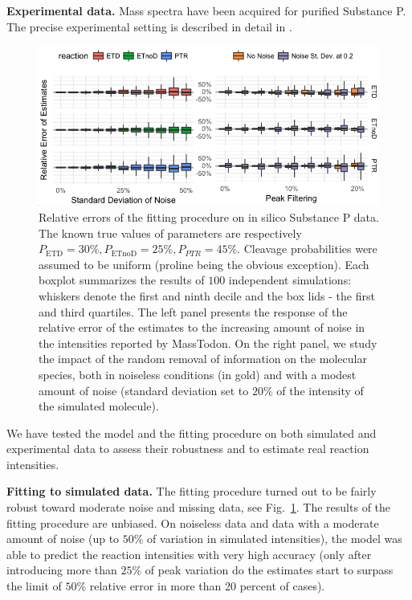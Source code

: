 \documentclass{llncs}
\begin{document}
\textbf{Experimental data.} Mass spectra have been acquired for purified Substance P. The precise experimental setting is described in detail in \cite{Lermyte2015-eb}.
\begin{figure}[h]
        \center
        \includegraphics[width=.9\textwidth]{kokos.png}
        \caption{ Relative errors of the fitting procedure on in silico Substance P data. The known true values of parameters are respectively $P_\text{ETD}=30\%, P_\text{ETnoD}= 25\%, P_{PTR}= 45\%$. Cleavage probabilities were assumed to be uniform (proline being the obvious exception). Each boxplot summarizes the results of $100$ independent simulations: whiskers denote the first and ninth decile and the box lids - the first and third quartiles. The left panel presents the response of the relative error of the estimates to the increasing amount of noise in the intensities reported by {\sc MassTodon}. On the right panel, we study the impact of the random removal of information on the molecular species, both in noiseless conditions (in gold) and with a modest amount of noise (standard deviation set to $20\%$ of the intensity of the simulated molecule).
        }\label{fig::kokos}
\end{figure}

We have tested the model and the fitting procedure on both simulated and experimental data to assess their robustness and to estimate real reaction intensities.

\textbf{Fitting to simulated data.} The fitting procedure turned out to be fairly robust toward moderate noise and missing data, see Fig.~\ref{fig::kokos}. The results of the fitting procedure are unbiased. On noiseless data and data with a moderate amount of noise (up to $50\%$ of variation in simulated intensities), the model was able to predict the reaction intensities with very high accuracy (only after introducing more than $25\%$ of peak variation do the estimates start to surpass the limit of $50\%$ relative error in more than 20 percent of cases).
\end{document}
